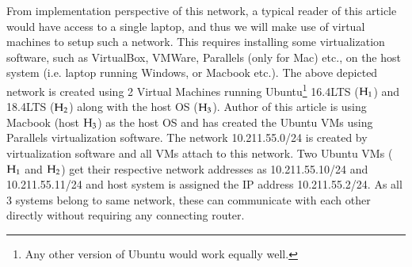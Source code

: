 \begin{multicols}{2}
From implementation perspective of this network, a typical reader of this article would have access to a single laptop, and thus we will make use of virtual machines to setup such a network. This requires installing some virtualization software, such as VirtualBox\cite{art2-key07}, VMWare\cite{art2-key09}, Parallels\cite{art2-key08} (only for Mac) etc., on the host system (i.e. laptop running Windows, or Macbook etc.). The above depicted network is created using 2 Virtual Machines running Ubuntu\footnote{Any other version of Ubuntu would work equally well.} 16.4LTS (${\rm H}_{1}$) and 18.4LTS (${\rm H}_{2}$) along with the host OS (${\rm H}_{3}$). Author of this article is using Macbook (host ${\rm H}_{3}$) as the host OS and has created the Ubuntu VMs using Parallels\cite{art2-key08} virtualization software. The network 10.211.55.0/24 is created by virtualization software and all VMs attach to this network. Two Ubuntu VMs (${\rm H}_{1}$ and ${\rm H}_{2}$) get their respective network addresses as 10.211.55.10/24 and 10.211.55.11/24 and host system is assigned the IP address 10.211.55.2/24. As all 3 systems belong to same network, these can communicate with each other directly without requiring any connecting router.
\end{multicols}

\vspace{-1.9cm}

